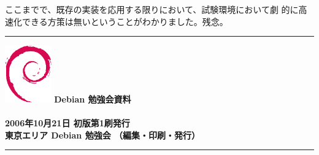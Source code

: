 \documentclass[mingoth,a4paper]{jsarticle}
\begin{document}
ここまでで、既存の実装を応用する限りにおいて、試験環境において劇
的に高速化できる方策は無いということがわかりました。残念。

\newpage

\vspace*{15cm}
\hrule
\vspace{2mm}
\includegraphics[width=2cm]{image200502/openlogo-nd.eps}
\noindent \Large \bf Debian 勉強会資料\\ \\
\noindent \normalfont 2006年10月21日 \hspace{5mm}  初版第1刷発行\\
\noindent \normalfont 東京エリア Debian 勉強会 （編集・印刷・発行）\\
\hrule
\end{document}
